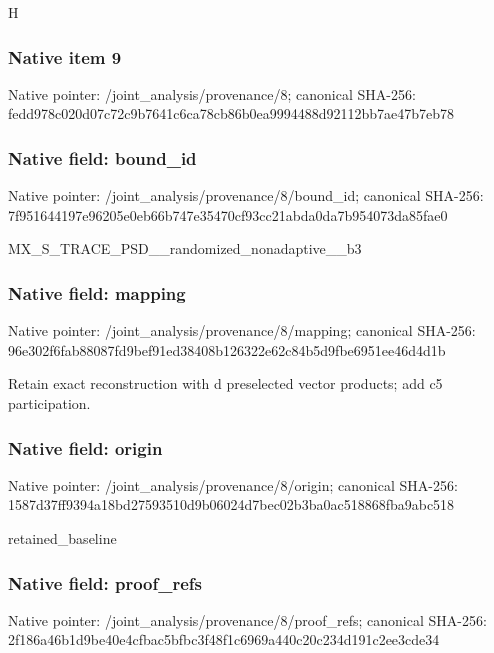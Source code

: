 \documentclass[10pt,a4paper]{article}
\begin{document}
\begingroup\raggedright\sloppy H\par\endgroup

\subsubsection{Native item 9}
Native pointer: /joint\_\allowbreak{}analysis/provenance/8; canonical SHA-256: fedd978c020d07c72c9b7641c6ca78cb86b0ea9994488d92112bb7ae47b7eb78

\subsubsection{Native field: bound\_\allowbreak{}id}
Native pointer: /joint\_\allowbreak{}analysis/provenance/8/bound\_\allowbreak{}id; canonical SHA-256: 7f951644197e96205e0eb66b747e35470cf93cc21abda0da7b954073da85fae0

\begingroup\raggedright\sloppy MX\_\allowbreak{}S\_\allowbreak{}TRACE\_\allowbreak{}PSD\_\allowbreak{}\_\allowbreak{}randomized\_\allowbreak{}nonadaptive\_\allowbreak{}\_\allowbreak{}b3\par\endgroup

\subsubsection{Native field: mapping}
Native pointer: /joint\_\allowbreak{}analysis/provenance/8/mapping; canonical SHA-256: 96e302f6fab88087fd9bef91ed38408b126322e62c84b5d9fbe6951ee46d4d1b

\begingroup\raggedright\sloppy Retain exact reconstruction with d preselected vector products;\allowbreak{} add c5 participation.\par\endgroup

\subsubsection{Native field: origin}
Native pointer: /joint\_\allowbreak{}analysis/provenance/8/origin; canonical SHA-256: 1587d37ff9394a18bd27593510d9b06024d7bec02b3ba0ac518868fba9abc518

\begingroup\raggedright\sloppy retained\_\allowbreak{}baseline\par\endgroup

\subsubsection{Native field: proof\_\allowbreak{}refs}
Native pointer: /joint\_\allowbreak{}analysis/provenance/8/proof\_\allowbreak{}refs; canonical SHA-256: 2f186a46b1d9be40e4cfbac5bfbc3f48f1c6969a440c20c234d191c2ee3cde34
\end{document}
